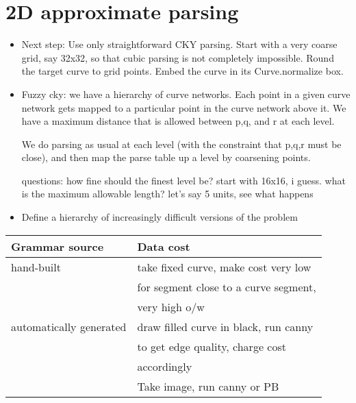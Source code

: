 \documentclass{book}
\begin{document}
\section{2D approximate parsing}
\label{sec-3_3}

\begin{itemize}
\item Next step: Use only straightforward CKY parsing. Start with a very
    coarse grid, say 32x32, so that cubic parsing is not completely
    impossible. Round the target curve to grid points. Embed the curve
    in its Curve.normalize box.
\item Fuzzy cky: we have a hierarchy of curve networks. Each point in a
    given curve network gets mapped to a particular point in the curve
    network above it. We have a maximum distance that is allowed
    between p,q, and r at each level.

    We do parsing as usual at each level (with the constraint that
    p,q,r must be close), and then map the parse table up a level by
    coarsening points.

    questions: how fine should the finest level be? start with 16x16,
    i guess. what is the maximum allowable length? let's say 5 units,
    see what happens
\item Define a hierarchy of increasingly difficult versions of the
    problem
\end{itemize}


\begin{center}
\begin{tabular}{ll}
\hline
 Grammar source           &  Data cost                              \\
\hline
 hand-built               &  take fixed curve, make cost very low   \\
                          &  for segment close to a curve segment,  \\
                          &  very high o/w                          \\
\hline
 automatically generated  &  draw filled curve in black, run canny  \\
                          &  to get edge quality, charge cost       \\
                          &  accordingly                            \\
\hline
                          &  Take image, run canny or PB            \\
\hline
\end{tabular}
\end{center}
\end{document}
